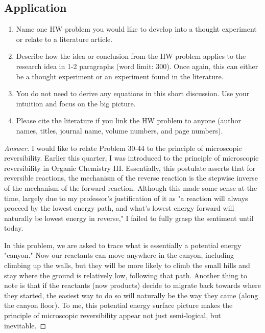 \documentclass[../psets.tex]{subfiles}
\begin{document}
\subsection*{Application}
\begin{enumerate}[label={\arabic*)}]
    \item Name one HW problem you would like to develop into a thought experiment or relate to a literature article.
    \item Describe how the idea or conclusion from the HW problem applies to the research idea in 1-2 paragraphs (word limit: 300). Once again, this can either be a thought experiment or an experiment found in the literature.
    \item You do not need to derive any equations in this short discussion. Use your intuition and focus on the big picture.
    \item Please cite the literature if you link the HW problem to anyone (author names, titles, journal name, volume numbers, and page numbers).
\end{enumerate}
\begin{proof}[Answer]
    I would like to relate Problem 30-44 to the principle of microscopic reversibility. Earlier this quarter, I was introduced to the principle of microscopic reversibility in Organic Chemistry III. Essentially, this postulate asserts that for reversible reactions, the mechanism of the reverse reaction is the stepwise inverse of the mechanism of the forward reaction. Although this made some sense at the time, largely due to my professor's justification of it as "a reaction will always proceed by the lowest energy path, and what's lowest energy forward will naturally be lowest energy in reverse," I failed to fully grasp the sentiment until today.\par
    In this problem, we are asked to trace what is essentially a potential energy "canyon." Now our reactants can move anywhere in the canyon, including climbing up the walls, but they will be more likely to climb the small hills and stay where the ground is relatively low, following that path. Another thing to note is that if the reactants (now products) decide to migrate back towards where they started, the easiest way to do so will naturally be the way they came (along the canyon floor). To me, this potential energy surface picture makes the principle of microscopic reversibility appear not just semi-logical, but inevitable.
\end{proof}
\end{document}
